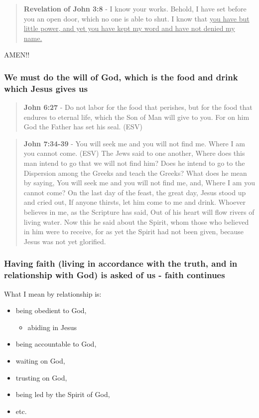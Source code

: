\documentclass[11pt]{article}
\begin{document}
\begin{quote}
\textbf{Revelation of John 3:8} - I know your works. Behold, I have set before you an open door, which no one is able to shut. I know that \uline{you have but little power, and yet you have kept my word and have not denied my name.}
\end{quote}

AMEN!!

\subsubsection{We must do the will of God, which is the food and drink which Jesus gives us}
\label{sec:org196c8b7}
\begin{quote}
\textbf{John 6:27} - Do not labor for the food that perishes, but for the food that endures to eternal life, which the Son of Man will give to you. For on him God the Father has set his seal. (ESV)
\end{quote}

\begin{quote}
\textbf{John 7:34-39} - You will seek me and you will not find me. Where I am you cannot come. (ESV) The Jews said to one another, Where does this man intend to go that we will not find him? Does he intend to go to the Dispersion among the Greeks and teach the Greeks?  What does he mean by saying, You will seek me and you will not find me, and, Where I am you cannot come?  On the last day of the feast, the great day, Jesus stood up and cried out, If anyone thirsts, let him come to me and drink.  Whoever believes in me, as the Scripture has said, Out of his heart will flow rivers of living water.  Now this he said about the Spirit, whom those who believed in him were to receive, for as yet the Spirit had not been given, because Jesus was not yet glorified.
\end{quote}

\subsubsection{Having faith (living in accordance with the truth, and in relationship with God) is asked of us - faith continues}
\label{sec:org6a1dbe0}
What I mean by relationship is:
\begin{itemize}
\item being obedient to God,
\begin{itemize}
\item abiding in Jesus
\end{itemize}
\item being accountable to God,
\item waiting on God,
\item trusting on God,
\item being led by the Spirit of God,
\item etc.
\end{itemize}
\end{document}
